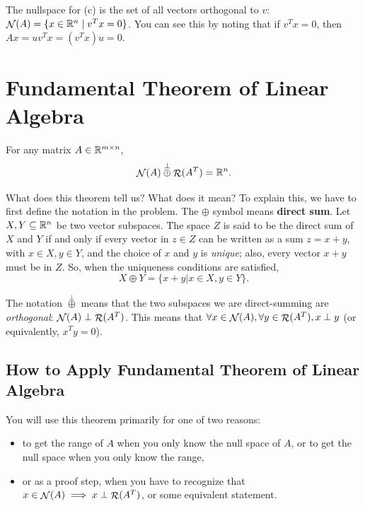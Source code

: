 \documentclass[12pt]{article}
\begin{document}
\begin{example}
The nullspace for (c) is the set of all vectors orthogonal to $v$: $\mathop{\mathcal{N}}\nolimits(A) = \{x \in { {\mathbb R}^{n} } \; | \; v^T x = 0\}$. You can see this by noting that if $v^T x = 0$, then $Ax = uv^T x = (v^T x) u = 0$. 
\end{example}

\pagebreak


\section{Fundamental Theorem of Linear Algebra}

\begin{theorem}For any matrix $A \in { {\mathbb R}^{m\times n} }$,
%
\begin{equation*}
\mathop{\mathcal{N}}\nolimits(A) \overset{\perp}{\oplus} \mathop{\mathcal{R}}\nolimits(A^T) = { {\mathbb R}^{n} }. 
\end{equation*}
\end{theorem}

What does this theorem tell us? What does it mean? To explain this, we have to first define the notation in the problem. The $\oplus$ symbol means \textbf{direct sum}. Let $X,Y \subseteq { {\mathbb R}^{n} }$ be two vector subspaces. The space $Z$ is said to be the direct sum of $X$ and $Y$ if and only if every vector in $z \in Z$ can be written as a sum $z = x + y$, with $x \in X, y \in Y$, and the choice of $x$ and $y$ is \textit{unique}; also, every vector $x+y$ must be in $Z$. So, when the uniqueness conditions are satisfied,
%
\begin{equation*}
X \oplus Y = \{x+y | x \in X, y \in Y\}.
\end{equation*}

The notation $\overset{\perp}{\oplus}$ means that the two subspaces we are direct-summing are \textit{orthogonal}: $\mathop{\mathcal{N}}\nolimits(A) \perp \mathop{\mathcal{R}}\nolimits(A^T)$. This means that $\forall x \in \mathop{\mathcal{N}}\nolimits(A), \forall y \in \mathop{\mathcal{R}}\nolimits(A^T), x \perp y$ (or equivalently, $x^T y = 0$). 

\subsection{How to Apply Fundamental Theorem of Linear Algebra}

You will use this theorem primarily for one of two reasons:
%
\begin{itemize}
\item to get the range of $A$ when you only know the null space of $A$, or to get the null space when you only know the range, 
\item or as a proof step, when you have to recognize that $x \in \mathop{\mathcal{N}}\nolimits(A) \implies x \perp \mathop{\mathcal{R}}\nolimits(A^T)$, or some equivalent statement.
\end{itemize}
\end{document}
